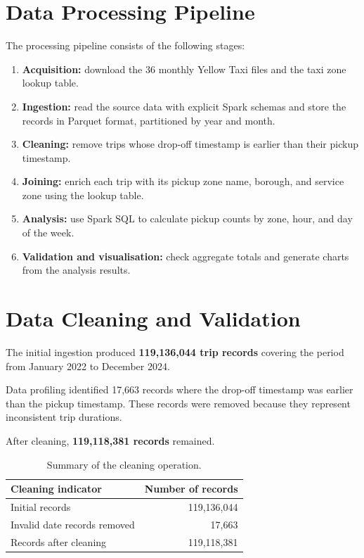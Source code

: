 \documentclass[10pt,a4paper]{article}
\begin{document}
\section{Data Processing Pipeline}

The processing pipeline consists of the following stages:

\begin{enumerate}
    \item \textbf{Acquisition:} download the 36 monthly Yellow Taxi
    files and the taxi zone lookup table.

    \item \textbf{Ingestion:} read the source data with explicit Spark
    schemas and store the records in Parquet format, partitioned by year
    and month.

    \item \textbf{Cleaning:} remove trips whose drop-off timestamp is
    earlier than their pickup timestamp.

    \item \textbf{Joining:} enrich each trip with its pickup zone name,
    borough, and service zone using the lookup table.

    \item \textbf{Analysis:} use Spark SQL to calculate pickup counts
    by zone, hour, and day of the week.

    \item \textbf{Validation and visualisation:} check aggregate totals
    and generate charts from the analysis results.
\end{enumerate}

\section{Data Cleaning and Validation}

The initial ingestion produced \textbf{119,136,044 trip records}
covering the period from January 2022 to December 2024.

Data profiling identified 17,663 records where the drop-off timestamp
was earlier than the pickup timestamp. These records were removed
because they represent inconsistent trip durations.

After cleaning, \textbf{119,118,381 records} remained.

\begin{table}[H]
\centering
\small
\begin{tabular}{lr}
\toprule
\textbf{Cleaning indicator} & \textbf{Number of records}\\
\midrule
Initial records & 119,136,044\\
Invalid date records removed & 17,663\\
Records after cleaning & 119,118,381\\
\bottomrule
\end{tabular}
\caption{Summary of the cleaning operation.}
\end{table}
\end{document}
